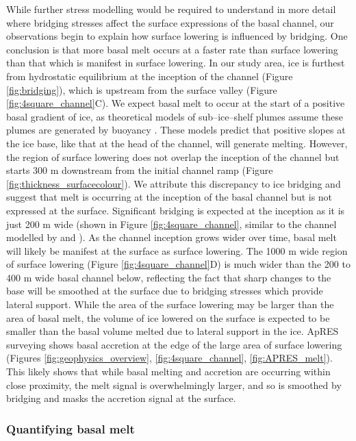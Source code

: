 While further stress modelling would be required to understand in more detail where bridging stresses affect the surface expressions of the basal channel, our observations begin to explain how surface lowering is influenced by bridging. One conclusion is that more basal melt occurs at a faster rate than surface lowering than that which is manifest in surface lowering. %
In our study area, ice is furthest from hydrostatic equilibrium at the inception of the channel (Figure \ref{fig:bridging}), which is upstream from the surface valley (Figure \ref{fig:4square_channel}C). 
We expect basal melt to occur at the start of a positive basal gradient of ice, as theoretical models \cite [e.g.][] {jenkins2011convection} of sub--ice--shelf plumes assume these plumes are generated by buoyancy \citep{jenkins1991one}. These models predict that positive slopes at the ice base, like that at the head of the channel, will generate melting. 
However, the region of surface lowering does not overlap the inception of the channel but starts 300 m downstream from the initial channel ramp (Figure \ref{fig:thickness_surfacecolour}). 
We attribute this discrepancy to ice bridging and suggest that melt is occurring at the inception of the basal channel but is not expressed at the surface. Significant bridging is expected at the inception as it is just 200 m wide (shown in Figure \ref{fig:4square_channel}, similar to the channel modelled by \cite{drews2015evolution} and \cite{wearing2021ice}). As the channel inception grows wider over time, basal melt will likely be manifest at the surface as surface lowering. 
The 1000 m wide region of surface lowering (Figure \ref{fig:4square_channel}D) is much wider than the 200 to 400 m wide basal channel below, reflecting the fact that sharp changes to the base will be smoothed at the surface due to bridging  stresses which provide lateral support. While the area of the surface lowering may be larger than the area of basal melt, the volume of ice lowered on the surface is expected to be smaller than the basal volume melted due to lateral support in the ice.
ApRES surveying shows basal accretion at the edge of the large area of surface lowering (Figures \ref{fig:geophysics_overview}, \ref{fig:4square_channel}, \ref{fig:APRES_melt}). This likely shows that while basal melting and accretion are occurring within close proximity, the melt signal is overwhelmingly larger, and so is smoothed by bridging and masks the accretion signal at the surface.

\subsubsection{Quantifying basal melt} \label{sec:melt}

